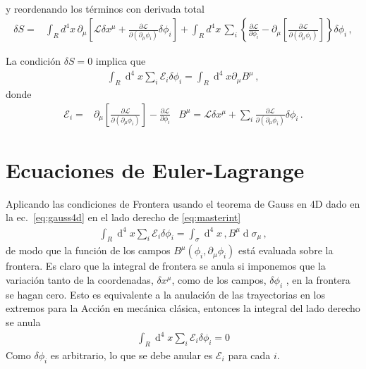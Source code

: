 \begin{frame}
\begin{align}
\end{align}
y reordenando los términos con derivada total
\begin{align}
  \delta S =&
\int_{R} d^4x\,\partial_{\mu} \left[\mathcal{L} \delta x^{\mu} + \frac{\partial\mathcal{L}}{\partial(\partial_{\mu}\phi_i)}\delta\phi_{i} \right]  + \int_{R}d^4x\,\sum_i \left\{ \frac{\partial\mathcal{L}}{\partial\phi_i} -\partial_{\mu} \left[ \frac{\partial\mathcal{L}}{\partial(\partial_{\mu}\phi_i)}\right]  \right\}\delta\phi_{i}\,,              
\end{align}
\end{frame}

\begin{frame}
La condición $\delta S=0$ implica que
\begin{align}
\label{eq:masterint}
\int_R \operatorname{d}^4x  \sum_i \mathcal{E}_i \delta\phi_i =\int_R \operatorname{d}^4x  \partial_{\mu} B^{\mu}\,,
\end{align}
donde
\begin{align}
\label{eq:master2}
  \mathcal{E}_i=&\partial_{\mu} \left[ \frac{\partial\mathcal{L}}{\partial(\partial_{\mu}\phi_i)}\right]-\frac{\partial\mathcal{L}}{\partial\phi_i} & B^{\mu}=\mathcal{L} \delta x^{\mu} +\sum_i \frac{\partial\mathcal{L}}{\partial(\partial_{\mu}\phi_i)}\delta\phi_{i}\,. 
\end{align}
\end{frame}


\section{Ecuaciones de Euler-Lagrange}


Aplicando las condiciones de Frontera usando  el teorema de Gauss en 4D dado en la ec.~\eqref{eq:gauss4d} en el lado derecho de \eqref{eq:masterint}
\begin{align}
\int_R \operatorname{d}^4x  \sum_i \mathcal{E}_i \delta\phi_i =\int_\sigma \operatorname{d}^4x \,, B^{\mu}\operatorname{d}\sigma_{\mu}\,,
\end{align}
de modo que la función de los campos $B^{\mu}(\phi_i,\partial_{\mu} \phi_{i})$ está evaluada sobre la frontera.
Es claro que la integral de frontera se anula si imponemos que la variación tanto de la coordenadas, $\delta x^{\mu}$, como de los campos, $\delta \phi_{i}$ , en la frontera se hagan cero. Esto es equivalente a la anulación de las trayectorias en los extremos para la Acción en mecánica clásica, 
entonces la integral del lado derecho se anula 
\begin{align}
\int_R \operatorname{d}^4x  \sum_i \mathcal{E}_i \delta\phi_i =0
\end{align}
Como $\delta\phi_i$ es arbitrario, lo que se debe anular es $\mathcal{E}_i$ para cada $i$.

